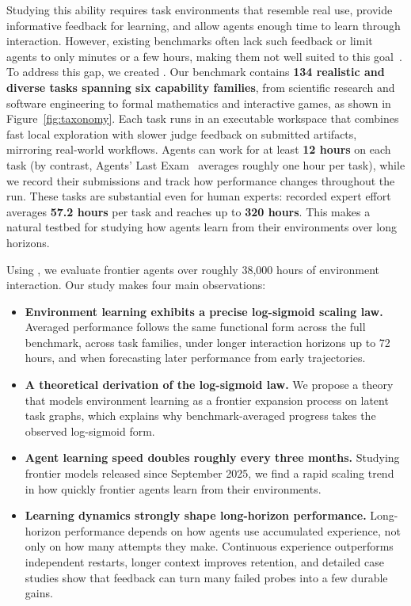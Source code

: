 Studying this ability requires task environments that resemble real use, provide informative feedback for learning, and allow agents enough time to learn through interaction. However, existing benchmarks often lack such feedback or limit agents to only minutes or a few hours, making them not well suited to this goal~\citep{jimenez2024swebench,chan2024mlebench,merrill2026terminalbench,sun2026agentslastexam,chu2026frontierswe,xu2026autolab}. To address this gap, we created \textbf{\benchmark{}}. Our benchmark contains \textbf{134 realistic and diverse tasks spanning six capability families}, from scientific research and software engineering to formal mathematics and interactive games, as shown in Figure~\ref{fig:taxonomy}. Each task runs in an executable workspace that combines fast local exploration with slower judge feedback on submitted artifacts, mirroring real-world workflows. Agents can work for at least \textbf{12 hours} on each task (by contrast, Agents' Last Exam~\citep{sun2026agentslastexam} averages roughly one hour per task), while we record their submissions and track how performance changes throughout the run. These tasks are substantial even for human experts: recorded expert effort averages \textbf{57.2 hours} per task and reaches up to \textbf{320 hours}. This makes \benchmark{} a natural testbed for studying how agents learn from their environments over long horizons.

Using \benchmark{}, we evaluate frontier agents over roughly 38{,}000 hours of
environment interaction. Our study makes four main observations:

\begin{itemize}
    \item \textbf{Environment learning exhibits a precise log-sigmoid scaling law.}
    Averaged performance follows the same functional form across the full
    benchmark, across task families, under longer interaction horizons up
    to 72 hours, and when forecasting later performance from early
    trajectories.

    \item \textbf{A theoretical derivation of the log-sigmoid law.}
    We propose a theory that models environment learning as a frontier expansion process on latent task graphs, which explains why benchmark-averaged progress takes the
    observed log-sigmoid form.

    \item \textbf{Agent learning speed doubles roughly every three months.}
    Studying frontier models released since September 2025, we find a rapid
    scaling trend in how quickly frontier agents learn from their environments.

    \item \textbf{Learning dynamics strongly shape long-horizon performance.}
    Long-horizon performance depends on how agents use accumulated experience,
    not only on how many attempts they make. Continuous experience outperforms
    independent restarts, longer context improves retention, and detailed
    case studies show that feedback can turn many failed probes into a few
    durable gains.
\end{itemize}
